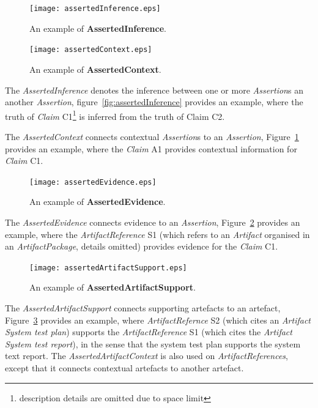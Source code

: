 \begin{figure}
	\centering
	\begin{minipage}[b]{0.49\textwidth}
		\texttt{[image: assertedInference.eps]}
		\caption{An example of \textbf{AssertedInference}.}
		\label{fig:assertedInference}
	\end{minipage}
	\hfill
	\begin{minipage}[b]{0.49\textwidth}
		\texttt{[image: assertedContext.eps]}
		\caption{An example of \textbf{AssertedContext}.}
		\label{fig:assertedContext}
	\end{minipage}
\end{figure}

The \textit{AssertedInference} denotes the inference between one or more \textit{Assertion}s an another \textit{Assertion}, figure~\ref{fig:assertedInference} provides an example, where the truth of \textit{Claim} C1\footnote{description details are omitted due to space limit} is inferred from the truth of Claim C2. 

The \textit{AssertedContext} connects contextual \textit{Assertion}s to an \textit{Assertion}, Figure~\ref{fig:assertedContext} provides an example, where the \textit{Claim} A1 provides contextual information for \textit{Claim} C1.

\begin{figure}
	\centering
	\texttt{[image: assertedEvidence.eps]}
	\caption{An example of \textbf{AssertedEvidence}.}
	\label{fig:assertedEvidence}
\end{figure}

The \textit{AssertedEvidence} connects evidence to an \textit{Assertion}, Figure~\ref{fig:assertedEvidence} provides an example, where the \textit{ArtifactReference} S1 (which refers to an \textit{Artifact} organised in an \textit{ArtifactPackage}, details omitted) provides evidence for the \textit{Claim} C1.

\begin{figure}
	\centering
	\texttt{[image: assertedArtifactSupport.eps]}
	\caption{An example of \textbf{AssertedArtifactSupport}.}
	\label{fig:assertedArtifactSupport}
\end{figure}

The \textit{AssertedArtifactSupport} connects supporting artefacts to an artefact, Figure~\ref{fig:assertedArtifactSupport} provides an example, where \textit{ArtifactRefernce} S2 (which cites an \textit{Artifact} \textit{System test plan}) supports the \textit{ArtifactReference} S1 (which cites the \textit{Artifact} \textit{System test report}), in the sense that the system test plan supports the system text report. The \textit{AssertedArtifactContext} is also used on \textit{ArtifactReferences}, except that it connects contextual artefacts to another artefact.

